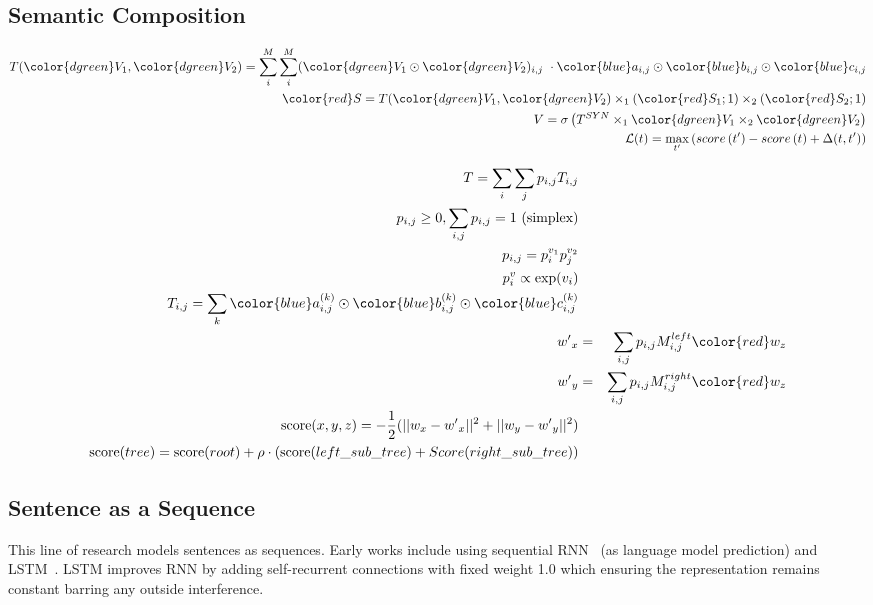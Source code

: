 \documentclass{article} %
\begin{document}
\subsection{Semantic Composition}
\begin{eqnarray}
T({\color{dgreen} V_1}, {\color{dgreen} V_2}) =  \sum\limits_{i}^{M}\sum\limits_{i}^{M}
({\color{dgreen} V_1} \odot {\color{dgreen} V_2})_{i,j}~ \cdot {\color{blue} a_{i,j} } \odot
{\color{blue} b_{i,j} } \odot  {\color{blue} c_{i,j}} \nonumber \\
{\color{red} S} = T({\color{dgreen} V_1}, {\color{dgreen} V_2})
\times_1 ({\color{red} S_1}; 1) \times_2 ({\color{red} S_2}; 1) \nonumber \\
V = \sigma\left( T^{SYN} \times_1 {\color{dgreen} V_1} \times_2 {\color{dgreen} V_2} \right) \nonumber \\
\mathcal{L}(t) = \max_{t'} \left(score\left(t'\right) - score\left(t\right) + \Delta(t, t')
\right)
\end{eqnarray}

\begin{eqnarray}
T = \sum\limits_{i} \sum\limits_{j} p_{i, j} T_{i,j} \\
p_{i,j} \geq 0, \sum\limits_{i,j} p_{i,j} = 1 ~\textrm{(simplex)} \\
p_{i,j} = p_{i}^{v_1} p_{j}^{v_2} \\
p_i^{v} \propto \exp(v_i) \\
T_{i,j} = \sum\limits_k {\color{blue} a_{i,j}^{(k)} } \odot {\color{blue} b_{i,j}^{(k)} } \odot  {\color{blue} c_{i,j}^{(k)}} \\
{w'}_x &=& \sum\limits_{i,j} p_{i,j} M_{i,j}^{left} {\color{red}w_z} \\
{w'}_y &=& \sum\limits_{i,j} p_{i,j} M_{i,j}^{right} {\color{red}w_z} \\
\mathrm{score}(x,y,z) = -\frac{1}{2}( || w_x - {w'}_x ||^2  + ||w_y - {w'}_y||^2)  \\
\mathrm{score}(tree) =  \mathrm{score}(root) + \rho \cdot (\mathrm{score}(left\_sub\_tree) + Score(right\_sub\_tree) )

\end{eqnarray}

\iffalse
\subsection{Sentence as a Sequence}
This line of research models sentences as sequences. Early works include
using sequential RNN~\cite{mikolov2010recurrent, mikolov2012context} (as
language model prediction) and LSTM~\cite{sutskever2014sequence}.
LSTM improves RNN by adding self-recurrent connections with fixed weight
1.0 which ensuring the representation remains constant barring any outside
interference.
\end{document}
